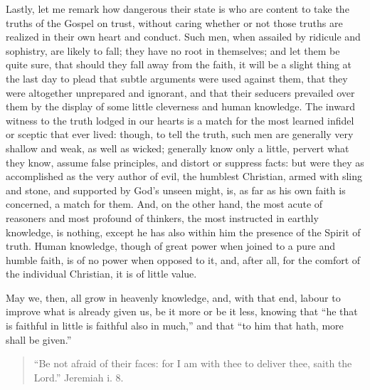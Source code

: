 Lastly, let me remark how dangerous their state is who are content
to take the truths of the Gospel on trust, without caring whether or
not those truths are realized in their own heart and conduct. Such
men, when assailed by ridicule and sophistry, are likely to fall; they
have no root in themselves; and let them be quite sure, that should
they fall away from the faith, it will be a slight thing at the last
day to plead that subtle arguments were used against them, that they
were altogether unprepared and ignorant, and that their seducers
prevailed over them by the display of some little cleverness and human
knowledge. The inward witness to the truth lodged in our hearts is a
match for the most learned infidel or sceptic that ever lived: though,
to tell the truth, such men are generally very shallow and weak, as
well as wicked; generally know only a little, pervert what they know,
assume false principles, and distort or suppress facts: but were they
as accomplished as the very author of evil, the humblest Christian,
armed with sling and stone, and supported by God's unseen might, is,
as far as his own faith is concerned, a match for them. And, on the
other hand, the most acute of reasoners and most profound of thinkers,
the most instructed in earthly knowledge, is nothing, except he has
also within him the presence of the Spirit of truth. Human knowledge,
though of great power when joined to a pure and humble faith, is of no
power when opposed to it, and, after all, for the comfort of the
individual Christian, it is of little value.

May we, then, all grow in heavenly knowledge, and, with that end,
labour to improve what is already given us, be it more or be it less,
knowing that ``he that is faithful in little is faithful also in
much,'' and that ``to him that hath, more shall be
given.''


\begin{quote}

``Be not afraid of their faces: for I am with thee to deliver
thee, saith the Lord.'' Jeremiah i. 8.

\end{quote}

